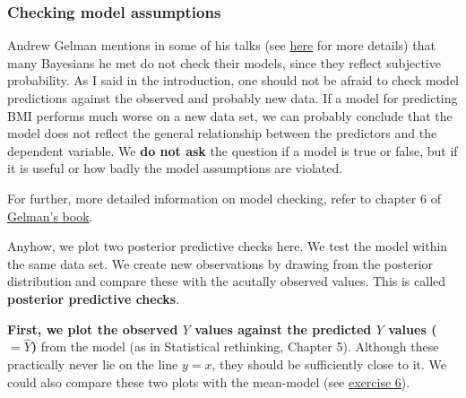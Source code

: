 \documentclass[
]{book}
\begin{document}
\subsubsection{Checking model assumptions}\label{check_model_bayes}

Andrew Gelman mentions in some of his talks (see \href{https://sites.stat.columbia.edu/gelman/research/published/philosophy_chapter.pdf}{here} for more details)
that many Bayesians he met do not check their models, since they reflect subjective probability.
As I said in the introduction, one should not be afraid to check model predictions against the observed
and probably new data. If a model for predicting BMI performs much worse on a new data set,
we can probably conclude that the model does not reflect the general relationship between the predictors
and the dependent variable. We \textbf{do not ask} the question if a model is true or false, but if it is useful or
how badly the model assumptions are violated.

For further, more detailed information on model checking, refer to chapter 6 of
\href{https://sites.stat.columbia.edu/gelman/book/BDA3.pdf}{Gelman's book}.

Anyhow, we plot two posterior predictive checks here.
We test the model within the same data set. We create new observations
by drawing from the posterior distribution and compare these with the acutally
observed values. This is called \textbf{posterior predictive checks}.

\textbf{First, we plot the observed \(Y\) values against the predicted \(Y\) values (\(=\hat{Y}\))}
from the model (as in Statistical rethinking, Chapter 5).
Although these practically never lie on the line \(y=x\), they should be sufficiently
close to it. We could also compare these two plots with the mean-model (see \hyperref[exercise6_multiple_regression]{exercise 6}).
\end{document}
